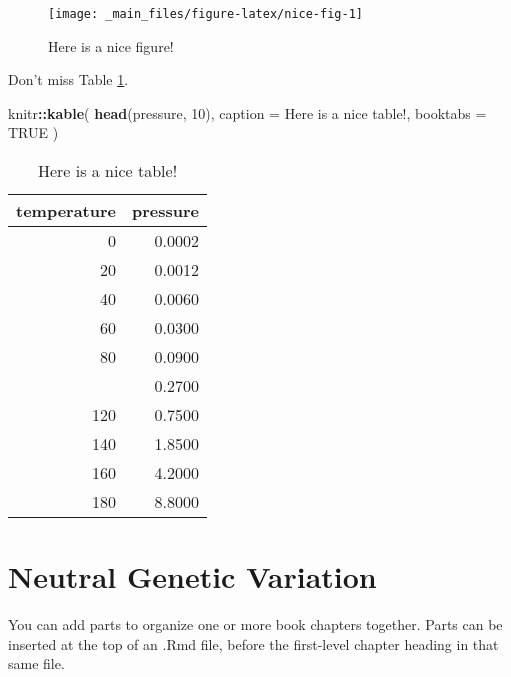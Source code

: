 \documentclass[
]{book}
\newenvironment{Shaded}{\begin{snugshade}}{\end{snugshade}}
\newcommand{\AttributeTok}[1]{\textcolor[rgb]{0.13,0.29,0.53}{#1}}
\newcommand{\ConstantTok}[1]{\textcolor[rgb]{0.56,0.35,0.01}{#1}}
\newcommand{\DecValTok}[1]{\textcolor[rgb]{0.00,0.00,0.81}{#1}}
\newcommand{\FunctionTok}[1]{\textcolor[rgb]{0.13,0.29,0.53}{\textbf{#1}}}
\newcommand{\NormalTok}[1]{#1}
\newcommand{\SpecialCharTok}[1]{\textcolor[rgb]{0.81,0.36,0.00}{\textbf{#1}}}
\newcommand{\StringTok}[1]{\textcolor[rgb]{0.31,0.60,0.02}{#1}}
\theoremstyle{definition}
\theoremstyle{definition}
\theoremstyle{definition}
\theoremstyle{definition}
\theoremstyle{remark}
\begin{document}
\begin{figure}

{\centering \texttt{[image: \_main\_files/figure-latex/nice-fig-1]} 

}

\caption{Here is a nice figure!}\label{fig:nice-fig}
\end{figure}

Don't miss Table \ref{tab:nice-tab}.

\begin{Shaded}
\begin{Highlighting}[]
\NormalTok{knitr}\SpecialCharTok{::}\FunctionTok{kable}\NormalTok{(}
  \FunctionTok{head}\NormalTok{(pressure, }\DecValTok{10}\NormalTok{), }\AttributeTok{caption =} \StringTok{\textquotesingle{}Here is a nice table!\textquotesingle{}}\NormalTok{,}
  \AttributeTok{booktabs =} \ConstantTok{TRUE}
\NormalTok{)}
\end{Highlighting}
\end{Shaded}

\begin{table}

\caption{\label{tab:nice-tab}Here is a nice table!}
\centering
\begin{tabular}[t]{rr}
\toprule
temperature & pressure\\
\midrule
0 & 0.0002\\
20 & 0.0012\\
40 & 0.0060\\
60 & 0.0300\\
80 & 0.0900\\
\addlinespace
100 & 0.2700\\
120 & 0.7500\\
140 & 1.8500\\
160 & 4.2000\\
180 & 8.8000\\
\bottomrule
\end{tabular}
\end{table}

\hypertarget{neutral-genetic-variation}{%
\chapter{Neutral Genetic Variation}\label{neutral-genetic-variation}}

You can add parts to organize one or more book chapters together. Parts can be inserted at the top of an .Rmd file, before the first-level chapter heading in that same file.
\end{document}
